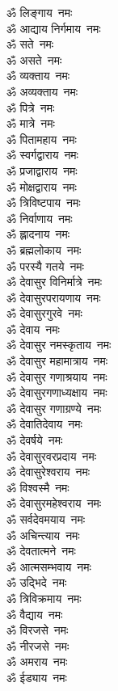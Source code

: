 \begin{multicols}{2}
\begin{flushleft}
ॐ लिङ्गाय~नमः\\
ॐ आद्याय निर्गमाय~नमः\\
ॐ सते~नमः\hfill{}\\
ॐ असते~नमः\\
ॐ व्यक्ताय~नमः\\
ॐ अव्यक्ताय~नमः\\
ॐ पित्रे~नमः\\
ॐ मात्रे~नमः\\
ॐ पितामहाय~नमः\\
ॐ स्वर्गद्वाराय~नमः\\
ॐ प्रजाद्वाराय~नमः\\
ॐ मोक्षद्वाराय~नमः\\
ॐ त्रिविष्टपाय~नमः\hfill{}\\
ॐ निर्वाणाय~नमः\\
ॐ ह्लादनाय~नमः\\
ॐ ब्रह्मलोकाय~नमः\\
ॐ परस्यै गतये~नमः\\
ॐ देवासुर विनिर्मात्रे~नमः\\
ॐ देवासुरपरायणाय~नमः\\
ॐ देवासुरगुरवे~नमः\\
ॐ देवाय~नमः\\
ॐ देवासुर नमस्कृताय~नमः\\
ॐ देवासुर महामात्राय~नमः\hfill{}\\
ॐ देवासुर गणाश्रयाय~नमः\\
ॐ देवासुरगणाध्यक्षाय~नमः\\
ॐ देवासुर गणाग्रण्ये~नमः\\
ॐ देवातिदेवाय~नमः\\
ॐ देवर्षये~नमः\\
ॐ देवासुरवरप्रदाय~नमः\\
ॐ देवासुरेश्वराय~नमः\\
ॐ विश्वस्मै~नमः\\
ॐ देवासुरमहेश्वराय~नमः\\
ॐ सर्वदेवमयाय~नमः\hfill{}\\
ॐ अचिन्त्याय~नमः\\
ॐ देवतात्मने~नमः\\
ॐ आत्मसम्भवाय~नमः\\
ॐ उद्भिदे~नमः\\
ॐ त्रिविक्रमाय~नमः\\
ॐ वैद्याय~नमः\\
ॐ विरजसे~नमः\\
ॐ नीरजसे~नमः\\
ॐ अमराय~नमः\\
ॐ ईड्याय~नमः\hfill{}\\

\end{flushleft}
\end{multicols}
